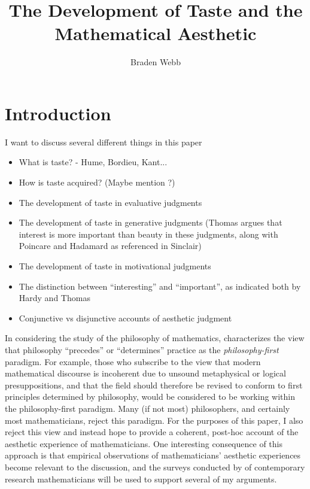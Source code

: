 \documentclass[a4paper,man,natbib]{apa6}
\title{The Development of Taste and the Mathematical Aesthetic}
\author{Braden Webb}
\affiliation{Department of Philosophy, Brigham Young University\\
PHIL 495R: Directed Readings in the Philosophy of Mathematics\\
Dr. Derek Haderlie\\
22 April 2023}
\begin{document}
\maketitle

\section{Introduction}
I want to discuss several different things in this paper

\begin{itemize}
      \item What is taste? - Hume, Bordieu, Kant...
      \item How is taste acquired? (Maybe mention \cite{mcallister_mathematical_2005}?)
      \item The development of taste in evaluative judgments
      \item The development of taste in generative judgments (Thomas argues that 
      interest is more important than beauty in these judgments, along with 
      Poincare and Hadamard as referenced in Sinclair)
      \item The development of taste in motivational judgments
      \item The distinction between ``interesting'' and ``important'', as indicated
      both by Hardy and Thomas
      \item Conjunctive vs disjunctive accounts of aesthetic judgment
\end{itemize}

In considering the study of the philosophy of mathematics, \cite{shapiro_thinking_2000} characterizes
the view that philosophy ``precedes'' or ``determines'' practice as the \textit{philosophy-first} paradigm.
For example, those who subscribe to the view that modern mathematical discourse is incoherent due to unsound
metaphysical or logical presuppositions, and that the field should therefore be revised to conform to
first principles determined by philosophy, would be considered to be working within the philosophy-first
paradigm. Many (if not most) philosophers, and certainly most mathematicians, reject this paradigm. For the
purposes of this paper, I also reject this view and instead hope to provide a coherent, post-hoc account
of the aesthetic experience of mathematicians. One interesting consequence of this approach is that empirical
observations of mathematicians' aesthetic experiences become relevant to the discussion, and the surveys
conducted by \cite{inglis_beauty_2015} of contemporary research mathematicians will be used to support several
of my arguments. 
\end{document}
